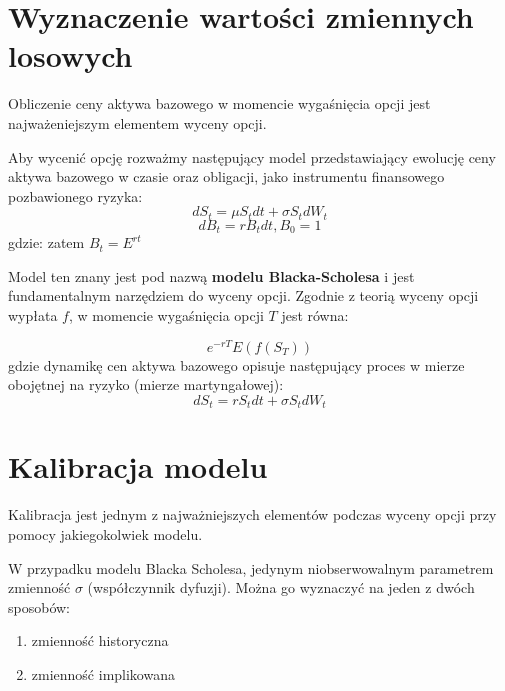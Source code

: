 \documentclass{pracamgr}
\begin{document}

\section{Wyznaczenie wartości zmiennych losowych}

Obliczenie ceny aktywa bazowego w momencie wygaśnięcia opcji jest najważeniejszym elementem 
wyceny opcji. 

Aby wycenić opcję rozważmy następujący model przedstawiający ewolucję ceny aktywa
bazowego w czasie oraz obligacji, jako instrumentu finansowego pozbawionego ryzyka:
\begin{equation}
  dS_t = \mu S_t dt + \sigma S_t d W_t 
\end{equation}
\begin{equation}
  dB_t = r B_t dt, B_0 = 1
\end{equation}
gdzie:
zatem $B_t = E^{rt}$

Model ten znany jest pod nazwą \textbf{modelu Blacka-Scholesa} i jest fundamentalnym narzędziem do wyceny opcji.
Zgodnie z teorią wyceny opcji wypłata $f$, w momencie wygaśnięcia opcji $T$ jest równa:

\begin{equation}
  e^{-rT} E(f(S_T))
\end{equation}
gdzie dynamikę cen aktywa bazowego opisuje następujący proces w mierze obojętnej na ryzyko (mierze martyngałowej):
\begin{equation}
   
  dS_t = r S_t dt + \sigma S_t d W_t 
\end{equation}



\section{Kalibracja modelu}
Kalibracja jest jednym z najważniejszych elementów podczas wyceny opcji przy pomocy jakiegokolwiek
modelu.  

W przypadku modelu Blacka Scholesa, jedynym niobserwowalnym parametrem zmienność $\sigma$ (współczynnik dyfuzji).
Można go wyznaczyć na jeden z dwóch sposobów:
\begin{enumerate}
  \item zmienność historyczna
  \item zmienność implikowana
\end{enumerate}
\end{document}
